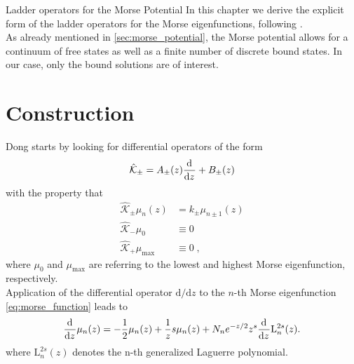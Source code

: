\begin{chapter}{Ladder operators for the Morse Potential}
In this chapter we derive the explicit form of the ladder operators for the Morse eigenfunctions,
following \cite{Dong_ladder_operators}.\\
As already mentioned in \ref{sec:morse_potential}, the Morse potential allows for a continuum of free states as well as a finite number of discrete bound states. In our case, only the bound 
solutions are of interest.


\section{Construction} %
\label{sec:Construction}
Dong starts by looking for differential operators of the form
\begin{equation}
    \label{eq:dong_operator_form}
    \hat{\mathcal{K}}_{\pm}=A_{\pm}(z)\frac{\mathrm{d}^{}}{\mathrm{d}z^{}}+B_{\pm}(z)
\end{equation}
with the property that
\begin{align}
    \hat{\mathcal{K}}_{\pm}\mu_n(z)&=k_{\pm}\mu_{n\pm 1}(z)\\
	\hat{\mathcal{K}}_{-}\mu_0&\equiv 0\\    
    \hat{\mathcal{K}}_{+}\mu_{\text{max}}&\equiv 0\;,
\end{align}
where $\mu_0$ and $\mu_{\text{max}}$ are referring to the lowest and highest Morse eigenfunction,
respectively.\\

Application of the differential operator $\mathrm{d}/\mathrm{d}z$ to the $n$-th Morse eigenfunction \eqref{eq:morse_function} leads to
\begin{equation}
    \label{eq:dong_apply_ddy}
    \frac{\mathrm{d}^{}}{\mathrm{d}z^{}}\mu_n(z)=-\frac{1}{2}\mu_n(z)+\frac{1}{z}s\mu_n(z)+N_n e^{-z/2}z^s\frac{\mathrm{d}^{}}{\mathrm{d}z^{}}\mathrm{L}_n^{2s}(z).
\end{equation}
where $\mathrm{L}_n^{2s}(z)$ denotes the n-th generalized Laguerre polynomial.\\


\end{chapter}
